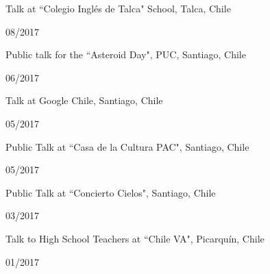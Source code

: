 \documentclass[12pt, a4paper]{article} %
\begin{document}
\begin{minipage}[t]{0.7\textwidth}
\begin{flushleft}%
  \setlength{\leftskip}{0.2cm}%
Talk at ``Colegio Ingl\'es de Talca" School, Talca, Chile
\end{flushleft}
\end{minipage}
\begin{minipage}[t]{0.3\textwidth}
\hfill 08/2017
\end{minipage}

\begin{minipage}[t]{0.7\textwidth}
\begin{flushleft}%
  \setlength{\leftskip}{0.2cm}%
Public talk for the ``Asteroid Day", PUC, Santiago, Chile
\end{flushleft}
\end{minipage}
\begin{minipage}[t]{0.3\textwidth}
\hfill 06/2017
\end{minipage}

\begin{minipage}[t]{0.7\textwidth}
\begin{flushleft}%
  \setlength{\leftskip}{0.2cm}%
Talk at Google Chile, Santiago, Chile
\end{flushleft}
\end{minipage}
\begin{minipage}[t]{0.3\textwidth}
\hfill 05/2017
\end{minipage}

\begin{minipage}[t]{0.7\textwidth}
\begin{flushleft}%
  \setlength{\leftskip}{0.2cm}%
Public Talk at ``Casa de la Cultura PAC", Santiago, Chile
\end{flushleft}
\end{minipage}
\begin{minipage}[t]{0.3\textwidth}
\hfill 05/2017
\end{minipage}

\begin{minipage}[t]{0.7\textwidth}
\begin{flushleft}%
  \setlength{\leftskip}{0.2cm}%
Public Talk at ``Concierto Cielos", Santiago, Chile
\end{flushleft}
\end{minipage}
\begin{minipage}[t]{0.3\textwidth}
\hfill 03/2017
\end{minipage}

\begin{minipage}[t]{0.7\textwidth}
\begin{flushleft}%
  \setlength{\leftskip}{0.2cm}%
Talk to High School Teachers at ``Chile VA", Picarqu\'in, Chile
\end{flushleft}
\end{minipage}
\begin{minipage}[t]{0.3\textwidth}
\hfill 01/2017
\end{minipage}
\end{document}
